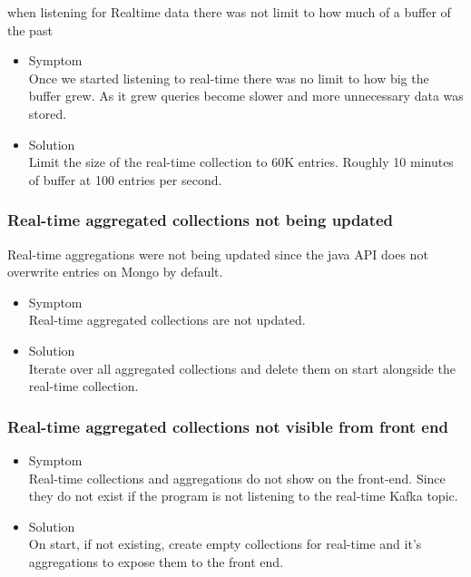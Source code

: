 \documentclass[oneside, english, final]{design}
\begin{document}
when listening for Realtime data there was not limit to how much of a buffer of the past 

\begin{itemize}
      \item{Symptom
            \\
            Once we started listening to real-time there was no limit to how big the buffer grew. As it grew queries become slower and more unnecessary data was stored.
	}
      \item{Solution
            \\
            Limit the size of the real-time collection to 60K entries. Roughly 10 minutes of buffer at 100 entries per second.
            }
\end{itemize}

\subsubsection{Real-time  aggregated collections not being updated}

Real-time aggregations were not being updated since the java API does not overwrite entries on Mongo by default.

\begin{itemize}
      \item{Symptom
            \\
            Real-time aggregated collections are not updated.
	}
      \item{Solution
            \\
            Iterate over all aggregated collections and delete them on start alongside the real-time collection.
            }
\end{itemize}

\subsubsection{Real-time  aggregated collections not visible from front end}

\begin{itemize}
      \item{Symptom
            \\
            Real-time collections and aggregations do not show on the front-end. Since they do not exist if the program is not listening to the real-time Kafka topic.
	}
      \item{Solution
            \\
            On start, if not existing, create empty collections for real-time and it's aggregations to expose them to the front end.
            }
\end{itemize}
\end{document}
